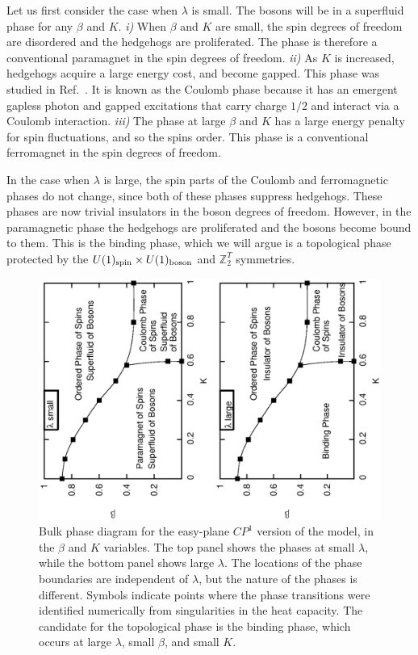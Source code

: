 \documentclass[prb,twocolumn]{revtex4-1}
\def\ztwot{\mathbb{Z}_2^T}
\begin{document}
Let us first consider the case when $\lambda$ is small. The bosons will be in a superfluid phase for any $\beta$ and $K$. 
{\it i)} When $\beta$ and $K$ are small, the spin degrees of freedom are disordered and the hedgehogs are proliferated. The phase is therefore a conventional paramagnet in the spin degrees of freedom. 
{\it ii)} As $K$ is increased, hedgehogs acquire a large energy cost, and become gapped. This phase was studied in Ref.~. It is known as the Coulomb phase because it has an emergent gapless photon and gapped excitations that carry charge $1/2$ and interact via a Coulomb interaction. 
{\it iii)} The phase at large $\beta$ and $K$ has a large energy penalty for spin fluctuations, and so the spins order. This phase is a conventional ferromagnet in the spin degrees of freedom. 

In the case when $\lambda$ is large, the spin parts of the Coulomb and ferromagnetic phases do not change, since both of these phases suppress hedgehogs. These phases are now trivial insulators in the boson degrees of freedom. However, in the paramagnetic phase the hedgehogs are proliferated and the bosons become bound to them. This is the binding phase, which we will argue is a topological phase protected by the $U(1)_{\rm spin}\times U(1)_{\rm boson}$ and $\ztwot$ symmetries.



\begin{figure}
\includegraphics[angle=-90,width=\linewidth]{figures/cp1bulkphase.eps}
\caption{Bulk phase diagram for the easy-plane $CP^1$ version of the model, in the $\beta$ and $K$ variables. The top panel shows the phases at small $\lambda$, while the bottom panel shows large $\lambda$. The locations of the phase boundaries are independent of $\lambda$, but the nature of the phases is different. Symbols indicate points where the phase transitions were identified numerically from singularities in the heat capacity. The candidate for the topological phase is the binding phase, which occurs at large $\lambda$, small $\beta$, and small $K$. }
\label{cp1bulkphase}
\end{figure}
 
\end{document}
